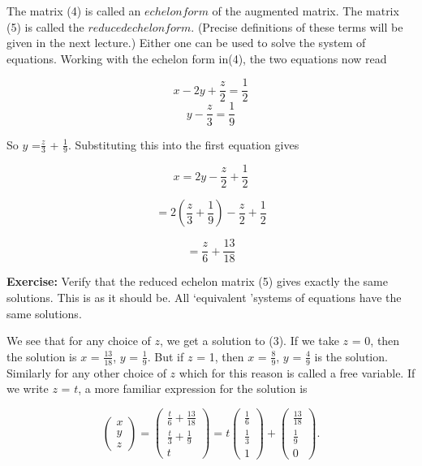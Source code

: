 \documentclass{book}
\begin{document}
The matrix (4) is called an $echelon form$ of the augmented matrix. The matrix (5) is called the $reduced echelon form$. (Precise definitions of these terms will be given in the next lecture.) Either one can be used to solve the system of equations. Working with the echelon form in(4), the two equations now read

\begin{equation}\label{eq}
	x - 2y + \frac{z}{2} = \frac{1}{2} \nonumber
\end{equation}
\begin{equation}\label{eq}
	y - \frac{z}{3} = \frac{1}{9} \nonumber
\end{equation}


So $y$ =$\frac{z}{3}$ + $\frac{1}{9}$. Substituting this into the first equation gives

\begin{equation}\label{eq}
	x = 2y - \frac{z}{2} + \frac{1}{2} \nonumber
\end{equation}


\begin{equation}\label{eq}
	= 2(\frac{z}{3} + \frac{1}{9}) - \frac{z}{2} + \frac{1}{2} \nonumber
\end{equation}

\begin{equation}\label{eq}
	= \frac{z}{6} + \frac{13}{18} \nonumber
			\end{equation}


\textbf{Exercise:} Verify that the reduced echelon matrix (5) gives exactly the same solutions. This is as it should be. All \lq equivalent \rq systems of equations have the same solutions.

We see that for any choice of $z$, we get a solution to (3). If we take $z$ = 0, then the solution is $x$ = $\frac{13}{18}$, $y$ = $\frac{1}{9}$. But if $z$ = 1, then $x$ = $\frac{8}{9}$, $y$ = $\frac{4}{9}$ is the solution. Similarly for any other choice of $z$ which for this reason is called a free variable. If we write $z$ = $t$, a more familiar expression for the solution is

\begin{equation}\label{eq}
	\begin{pmatrix} x \\ y \\ z\end{pmatrix} = \begin{pmatrix} \frac{t}{6}+ \frac{13}{18} \\[2pt] \frac{t}{3} + \frac{1}{9} \\[2pt] t \end{pmatrix} = t \begin{pmatrix} \frac{1}{6} \\[2pt] \frac{1}{3} \\[2pt] 1 \end{pmatrix} + \begin{pmatrix} \frac{13}{18} \\[2pt] \frac{1}{9} \\[2pt] 0 \end{pmatrix} .
\end{equation}
\end{document}
